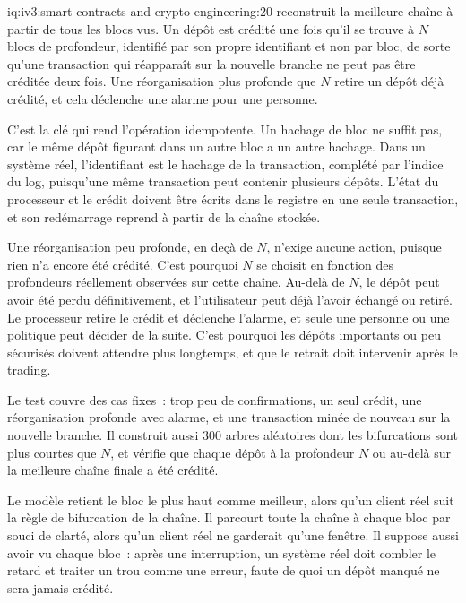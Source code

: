 \begin{solution}{iq:iv3:smart-contracts-and-crypto-engineering:20}
 reconstruit la meilleure chaîne à partir de tous les blocs vus. Un dépôt est crédité une fois qu'il se trouve à $N$ blocs de profondeur, identifié par son propre identifiant et non par bloc, de sorte qu'une transaction qui réapparaît sur la nouvelle branche ne peut pas être créditée deux fois. Une réorganisation plus profonde que $N$ retire un dépôt déjà crédité, et cela déclenche une alarme pour une personne.
\label{lst:iv3:cr:deposits}

C'est la clé qui rend l'opération idempotente. Un hachage de bloc ne suffit pas, car le même dépôt figurant dans un autre bloc a un autre hachage. Dans un système réel, l'identifiant est le hachage de la transaction, complété par l'indice du log, puisqu'une même transaction peut contenir plusieurs dépôts. L'état du processeur et le crédit doivent être écrits dans le registre en une seule transaction, et son redémarrage reprend à partir de la chaîne stockée.

Une réorganisation peu profonde, en deçà de $N$, n'exige aucune action, puisque rien n'a encore été crédité. C'est pourquoi $N$ se choisit en fonction des profondeurs réellement observées sur cette chaîne. Au-delà de $N$, le dépôt peut avoir été perdu définitivement, et l'utilisateur peut déjà l'avoir échangé ou retiré. Le processeur retire le crédit et déclenche l'alarme, et seule une personne ou une politique peut décider de la suite. C'est pourquoi les dépôts importants ou peu sécurisés doivent attendre plus longtemps, et que le retrait doit intervenir après le trading.

Le test couvre des cas fixes~: trop peu de confirmations, un seul crédit, une réorganisation profonde avec alarme, et une transaction minée de nouveau sur la nouvelle branche. Il construit aussi 300 arbres aléatoires dont les bifurcations sont plus courtes que $N$, et vérifie que chaque dépôt à la profondeur $N$ ou au-delà sur la meilleure chaîne finale a été crédité.

Le modèle retient le bloc le plus haut comme meilleur, alors qu'un client réel suit la règle de bifurcation de la chaîne. Il parcourt toute la chaîne à chaque bloc par souci de clarté, alors qu'un client réel ne garderait qu'une fenêtre. Il suppose aussi avoir vu chaque bloc~: après une interruption, un système réel doit combler le retard et traiter un trou comme une erreur, faute de quoi un dépôt manqué ne sera jamais crédité.

\end{solution}

